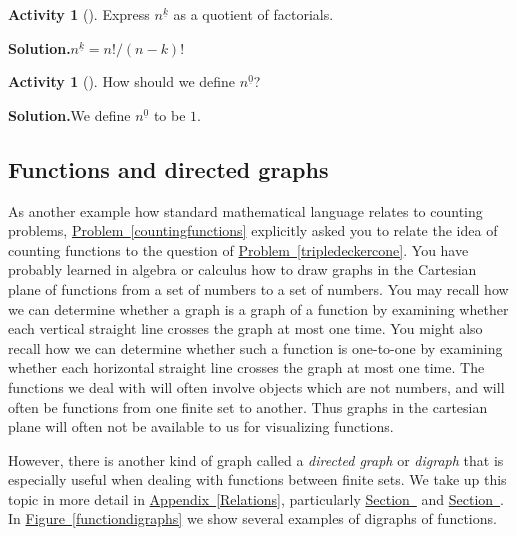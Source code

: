 \documentclass[10pt,]{book}
\theoremstyle{plain}
\theoremstyle{definition}
\newtheorem{activity}[project]{Activity}
\numberwithin{equation}{chapter}
\begin{document}
\begin{activity}[]\label{activity-21}
Express \(n^{\underline{k}}\) as a quotient of factorials.%
\par\medskip\noindent%
\textbf{Solution.}\quad \(n^{\underline{k}}=n!/(n-k)!\)%
\end{activity}
\begin{activity}[]\label{activity-22}
How should we define \(n^{\underline{0}}\)?%
\par\medskip\noindent%
\textbf{Solution.}\quad We define \(n^{\underline{0}}\) to be \(1\).%
\end{activity}
\typeout{************************************************}
\typeout{************************************************}
\subsection[{Functions and directed graphs}]{Functions and directed graphs}\label{subsection-2}
As another example how standard mathematical language relates to counting problems, \hyperref[countingfunctions]{Problem~\ref{countingfunctions}} explicitly asked you to relate the idea of counting functions to the question of \hyperref[tripledeckercone]{Problem~\ref{tripledeckercone}}. You have probably learned in algebra or calculus how to draw graphs in the Cartesian plane of functions from a set of numbers to a set of numbers. You may recall how we can determine whether a graph is a graph of a function by examining whether each vertical straight line crosses the graph at most one time. You might also recall how we can determine whether such a function is one-to-one by examining whether each horizontal straight line crosses the graph at most one time. The functions we deal with will often involve objects which are not numbers, and will often be functions from one finite set to another. Thus graphs in the cartesian plane will often not be available to us for visualizing functions.%
\par
However, there is another kind of graph called a \emph{directed graph} or \emph{digraph} that is especially useful when dealing with functions between finite sets. We take up this topic in more detail in \hyperref[Relations]{Appendix~\ref{Relations}}, particularly \hyperref[relationdigraph]{Section~} and \hyperref[digraphsoffunctions]{Section~}. In \hyperref[functiondigraphs]{Figure~\ref{functiondigraphs}} we show several examples of digraphs of functions.%
\end{document}
